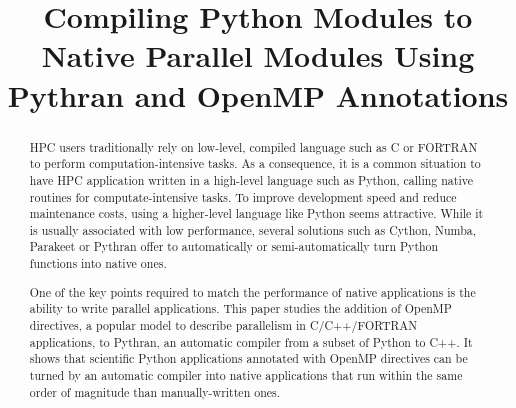 \documentclass[conference]{IEEEtran}
\begin{document}
\renewcommand{\thelstlisting}{\arabic{lstlisting}}
%
\title{Compiling Python Modules to Native Parallel Modules Using Pythran and
OpenMP Annotations}

\author{
    \newline
}

\maketitle

%
\begin{abstract}

    HPC users traditionally rely on low-level, compiled language such as C or
    FORTRAN to perform computation-intensive tasks. As a consequence, it is a
    common situation to have HPC application written in a high-level language
    such as Python, calling native routines for computate-intensive tasks. To
    improve development speed and reduce maintenance costs, using a higher-level
    language like Python seems attractive. While it is usually associated with
    low performance, several solutions such as Cython, Numba, Parakeet or 
    Pythran offer to automatically or semi-automatically turn Python functions 
    into native ones.

    One of the key points required to match the performance of native 
    applications is the ability to write parallel applications. This paper
    studies the addition of OpenMP directives, a popular model to describe
    parallelism in C/C++/FORTRAN applications, to Pythran, an automatic compiler     
    from a subset of Python to C++. It shows that scientific Python applications
    annotated with OpenMP directives can be turned by an automatic compiler into 
    native applications that run within the same order of magnitude than
    manually-written ones.
\end{abstract}
\end{document}
